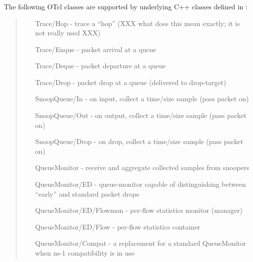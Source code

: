 \subsubsection{}
The following OTcl classes are supported by underlying C++
classes defined in :
\begin{quote}
\begin{itemize}
	\item [Trace/Hop] - trace a ``hop'' (XXX what does this mean exactly; it is not really used XXX)
	\item [Trace/Enque] - packet arrival at a queue
	\item [Trace/Deque] - packet departure at a queue
	\item [Trace/Drop] - packet drop at a queue (delivered to drop-target)
	\item [SnoopQueue/In] - on input, collect a time/size sample (pass packet on)
	\item [SnoopQueue/Out] - on output, collect a time/size sample (pass packet on)
	\item [SnoopQueue/Drop] - on drop, collect a time/size sample (pass packet on)
	\item [QueueMonitor] - receive and aggregate collected samples from snoopers
	\item [QueueMonitor/ED] - queue-monitor capable of distinguishing between ``early'' and standard packet drops
	\item [QueueMonitor/ED/Flowmon] - per-flow statistics monitor (manager)
	\item [QueueMonitor/ED/Flow] - per-flow statistics container
	\item [QueueMonitor/Compat] - a replacement for a standard QueueMonitor when ns-1 compatibility is in use
\end{itemize}
\end{quote}

